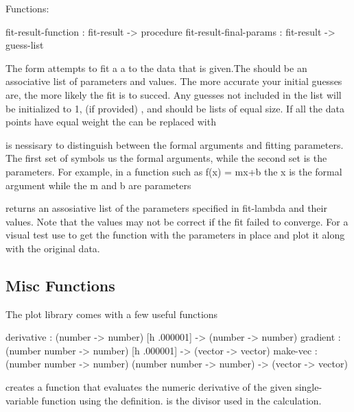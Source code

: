 \documentclass{article}
\begin{document}
{{{\begin{schemedisplay}
Functions:
  
  fit-result-function : fit-result -> procedure
  fit-result-final-params : fit-result -> guess-list
      
       
\end{schemedisplay}



The  form attempts to fit a a  to the data that is given.The should be an associative list of parameters and values. The more accurate  your initial guesses are, the more likely the fit is to succed. Any guesses not included in the list will be initialized to 1,  (if provided) ,  and  should be lists of equal size. If all the data points have equal weight
       the  can be replaced with 


 is nessisary to distinguish between the formal arguments and fitting parameters. The first set of symbols us the formal arguments, while the second set is the parameters. For example, in a function such as f(x) = mx+b the x is the formal argument while the m and b are parameters


 returns an assosiative list of the parameters specified  in fit-lambda and their values. Note that the values may not be correct if the fit failed to converge. For a visual test use  to get the function with the parameters in place and plot it along with the original data.

\subsection{Misc Functions}


The plot library comes with a few useful functions


\begin{schemedisplay}

derivative      : (number -> number) [h .000001] -> (number -> number)   
gradient : (number number -> number) [h .000001] -> (vector -> vector)
make-vec : (number number -> number) (number number -> number) -> (vector -> vector) 
\end{schemedisplay}

 creates a function that evaluates the numeric derivative of the given  single-variable function using the definition.  is the divisor used in the calculation.


}}}
\end{document}
